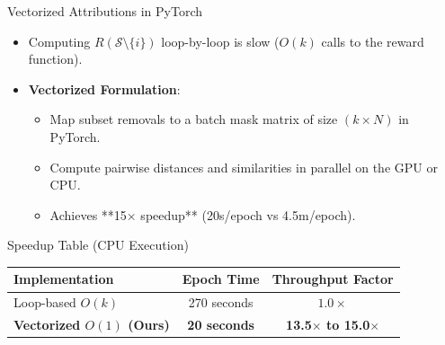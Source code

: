 \documentclass[aspectratio=169]{beamer}
\begin{document}
\begin{frame}{Vectorized Attributions in PyTorch}
    \begin{itemize}
        \item Computing $R(\mathcal{S} \setminus \{i\})$ loop-by-loop is slow ($O(k)$ calls to the reward function).
        \item \textbf{Vectorized Formulation}:
        \begin{itemize}
            \item Map subset removals to a batch mask matrix of size $(k \times N)$ in PyTorch.
            \item Compute pairwise distances and similarities in parallel on the GPU or CPU.
            \item Achieves **15× speedup** (20s/epoch vs 4.5m/epoch).
        \end{itemize}
    \end{itemize}
    \begin{block}{Speedup Table (CPU Execution)}
        \centering
        \begin{tabular}{lcc}
            \toprule
            \textbf{Implementation} & \textbf{Epoch Time} & \textbf{Throughput Factor} \\
            \midrule
            Loop-based $O(k)$ & 270 seconds & $1.0\times$ \\
            \textbf{Vectorized $O(1)$ (Ours)} & \textbf{20 seconds} & \textbf{13.5$\times$ to 15.0$\times$} \\
            \bottomrule
        \end{tabular}
    \end{block}
\end{frame}
\end{document}
